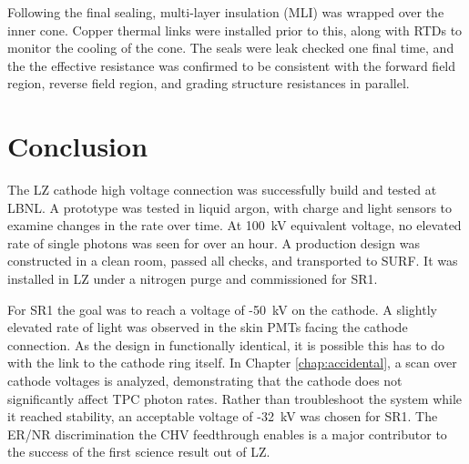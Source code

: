 Following the final sealing, multi-layer insulation (MLI) was wrapped over the inner cone.
Copper thermal links were installed prior to this, along with RTDs to monitor the cooling of the cone.
The seals were leak checked one final time, and the the effective resistance was confirmed to be consistent with the forward field region, reverse field region, and grading structure resistances in parallel.


\afterpage{\FloatBarrier}
\section{Conclusion}

The LZ cathode high voltage connection was successfully build and tested at LBNL.
A prototype was tested in liquid argon, with charge and light sensors to examine changes in the rate over time.
At 100~kV equivalent voltage, no elevated rate of single photons was seen for over an hour.
A production design was constructed in a clean room, passed all checks, and transported to SURF.
It was installed in LZ under a nitrogen purge and commissioned for SR1.

For SR1 the goal was to reach a voltage of -50~kV on the cathode.
A slightly elevated rate of light was observed in the skin PMTs facing the cathode connection. 
As the design in functionally identical, it is possible this has to do with the link to the cathode ring itself. 
In Chapter \ref{chap:accidental}, a scan over cathode voltages is analyzed, demonstrating that the cathode does not significantly affect TPC photon rates.
Rather than troubleshoot the system while it reached stability, an acceptable voltage of -32~kV was chosen for SR1.
The ER/NR discrimination the CHV feedthrough enables is a major contributor to the success of the first science result out of LZ.

